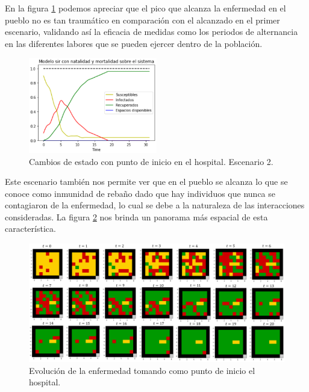 En la figura \ref{fig:metricas2} podemos apreciar que el pico que alcanza la enfermedad en el pueblo no es tan traumático en comparación con el alcanzado en el primer escenario, validando así la eficacia de medidas como los periodos de alternancia en las diferentes labores que se pueden ejercer dentro de la población.

\newpage

\begin{figure}[h]
  \centering
    \includegraphics[width=0.5\textwidth]{Imagenes/metricas2.PNG}
    \caption{Cambios de estado con punto de inicio en el hospital. Escenario 2.}
    \label{fig:metricas2}
\end{figure}

Este escenario también nos permite ver que en el pueblo se alcanza lo que se conoce como inmunidad de rebaño dado que hay individuos que nunca se contagiaron de la enfermedad, lo cual se debe a la naturaleza de las interacciones consideradas. La figura \ref{fig:evo2} nos brinda un panorama más espacial de esta característica.

\begin{figure}[h]
  \centering
    \includegraphics[width=1.05\textwidth]{Imagenes/evo2.PNG}
    \caption{Evolución de la enfermedad tomando como punto de inicio el hospital.}
    \label{fig:evo2}
\end{figure}


